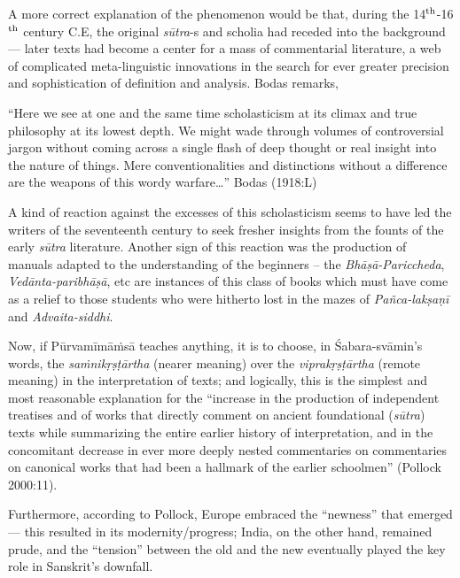A more correct explanation of the phenomenon would be that, during the 14$^{\rm th}$-16$^{\rm th}$ century C.E, the original {\sl sūtra}-s and scholia had receded into the background — later texts had become a center for a mass of commentarial literature, a web of complicated meta-linguistic innovations in the search for ever greater precision and sophistication of definition and analysis. Bodas remarks,
\begin{myquote}
“Here we see at one and the same time scholasticism at its climax and true philosophy at its lowest depth. We might wade through volumes of controversial jargon without coming across a single flash of deep thought or real insight into the nature of things. Mere conventionalities and distinctions without a difference are the weapons of this wordy warfare…” \hfill{Bodas (1918:L)}
\end{myquote}

A kind of reaction against the excesses of this scholasticism seems to have led the writers of the seventeenth century to seek fresher insights from the founts of the early {\sl sūtra} literature. Another sign of this reaction was the production of manuals adapted to the understanding of the beginners – the {\sl Bhāṣā-Pariccheda}, {\sl Vedānta-paribhāṣā}, etc are instances of this class of books which must have come as a relief to those students who were hitherto lost in the mazes of {\sl Pañca-lakṣaṇī} and {\sl Advaita-siddhi}. 

Now, if Pūrvamīmāṁsā teaches anything, it is to choose, in Śabara-svāmin’s words, the {\sl saṁnikṛṣṭārtha} (nearer meaning) over the {\sl viprakṛṣṭārtha} (remote meaning) in the interpretation of texts; and logically, this is the simplest and most reasonable explanation for the “increase in the production of independent treatises and of works that directly comment on ancient foundational ({\sl sūtra}) texts while summarizing the entire earlier history of interpretation, and in the concomitant decrease in ever more deeply nested commentaries on commentaries on canonical works that had been a hallmark of the earlier schoolmen” (Pollock 2000:11).

Furthermore, according to Pollock, Europe embraced the “newness” that emerged— this resulted in its modernity/progress; India, on the other hand, remained prude, and the “tension” between the old and the new eventually played the key role in Sanskrit’s downfall.

